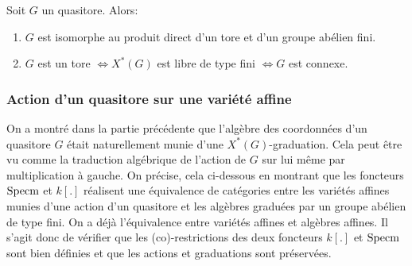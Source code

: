 \begin{cor}
Soit $G$ un quasitore. Alors:
\begin{enumerate}
\item $G$ est isomorphe au produit direct d'un tore et d'un groupe abélien fini.
\item $G$ est un tore $\iff X^*(G)$ est libre de type fini $\iff G$ est connexe.
\end{enumerate}
\end{cor}

\subsubsection{Action d'un quasitore sur une variété affine}

On a montré dans la partie précédente que l'algèbre des coordonnées d'un quasitore $G$ était naturellement munie d'une $X^*(G)$-graduation. Cela peut être vu comme la traduction algébrique de l'action de $G$ sur lui même par multiplication à gauche. On précise, cela ci-dessous en montrant que les foncteurs $\operatorname{Specm}$ et $k[.]$ réalisent une équivalence de catégories entre les variétés affines munies d'une action d'un quasitore et les algèbres graduées par un groupe abélien de type fini. On a déjà l'équivalence entre variétés affines et algèbres affines. Il s'agit donc de vérifier que les (co)-restrictions des deux foncteurs $k[.]$ et $\operatorname{Specm}$ sont bien définies et que les actions et graduations sont préservées.

